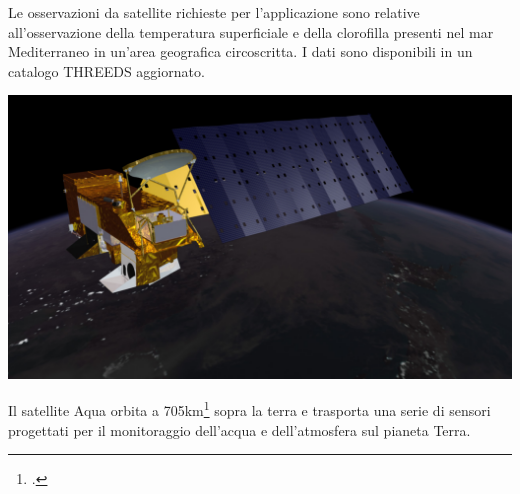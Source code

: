 \documentclass[./main.tex]{subfiles}
\begin{document}
Le osservazioni da satellite richieste per l'applicazione sono relative all'osservazione della temperatura superficiale e della clorofilla presenti nel mar Mediterraneo in un'area geografica circoscritta. I dati sono disponibili in un catalogo THREEDS aggiornato.\par

\noindent \begin{minipage}{0.5\textwidth}
\vspace{1cm}
\includegraphics[width=\textwidth]{images/aqua_render_lrg.pdf}
\captionsetup{font=small, hypcap=false}
\label{fig:aqua}
\end{minipage}
\hspace{0.05\textwidth}
\begin{minipage}{0.4\textwidth}
\begin{small}
Il satellite Aqua orbita a 705km\footcite[\url{{https://aqua.nasa.gov/content/about-aqua}}]{website-satellite-aqua} sopra la terra e trasporta una serie di sensori progettati per il monitoraggio dell'acqua e dell'atmosfera sul pianeta Terra.
\end{small}
\end{minipage}
\vspace{0.25cm}

\end{document}
